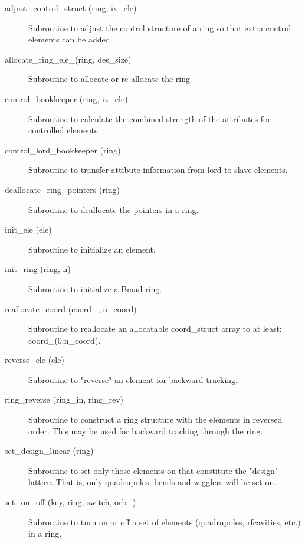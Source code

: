 \begin{description}

\item[adjust\_control\_struct (ring, ix\_ele)] \Newline
Subroutine to adjust the control structure of a ring so that 
extra control elements can be added. 

\item[allocate\_ring\_ele\_(ring, des\_size)] \Newline 
Subroutine to allocate or re-allocate the ring%

\item[control\_bookkeeper (ring, ix\_ele)] \Newline
Subroutine to calculate the combined strength of the attributes for
controlled elements.

\item[control\_lord\_bookkeeper (ring)] \Newline 
Subroutine to transfer attibute information from lord to slave elements.

\item[deallocate\_ring\_pointers (ring)] \Newline 
Subroutine to deallocate the pointers in a ring.

\item[init\_ele (ele)] \Newline
Subroutine to initialize an element. 

\item[init\_ring (ring, n)] \Newline 
Subroutine to initialize a Bmad ring.

\item[reallocate\_coord (coord\_, n\_coord)] \Newline 
Subroutine to reallocate an allocatable  coord\_struct array to at least:
coord\_(0:n\_coord).

\item[reverse\_ele (ele)] \Newline
Subroutine to "reverse" an element for backward tracking. 

\item[ring\_reverse (ring\_in, ring\_rev)] \Newline
Subroutine to construct a ring structure with the elements in reversed 
order. This may be used for backward tracking through the ring. 

\item[set\_design\_linear (ring)] \Newline
Subroutine to set only those elements on that constitute the "design" 
lattice. That is, only quadrupoles, bends and wigglers will be set on. 

\item[set\_on\_off (key, ring, switch, orb\_)] \Newline
Subroutine to turn on or off a set of elements (quadrupoles,
rfcavities, etc.) in a ring.


\end{description}
